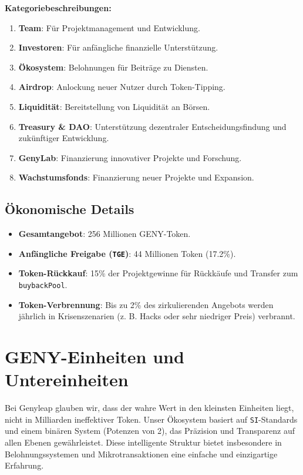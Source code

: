 \documentclass[a4paper,12pt,openany]{book}
\begin{document}
\textbf{Kategoriebeschreibungen:}
\begin{enumerate}
    \item \textbf{Team}: Für Projektmanagement und Entwicklung.
    \item \textbf{Investoren}: Für anfängliche finanzielle Unterstützung.
    \item \textbf{Ökosystem}: Belohnungen für Beiträge zu Diensten.
    \item \textbf{Airdrop}: Anlockung neuer Nutzer durch Token-Tipping.
    \item \textbf{Liquidität}: Bereitstellung von Liquidität an Börsen.
    \item \textbf{Treasury & DAO}: Unterstützung dezentraler Entscheidungsfindung und zukünftiger Entwicklung.
    \item \textbf{GenyLab}: Finanzierung innovativer Projekte und Forschung.
    \item \textbf{Wachstumsfonds}: Finanzierung neuer Projekte und Expansion.
\end{enumerate}

\subsection*{Ökonomische Details}
\begin{itemize}
    \item \textbf{Gesamtangebot}: 256 Millionen GENY-Token.
    \item \textbf{Anfängliche Freigabe (\texttt{TGE})}: 44 Millionen Token (17.2\%).
    \item \textbf{Token-Rückkauf}: 15\% der Projektgewinne für Rückkäufe und Transfer zum \texttt{buybackPool}.
    \item \textbf{Token-Verbrennung}: Bis zu 2\% des zirkulierenden Angebots werden jährlich in Krisenszenarien (z. B. Hacks oder sehr niedriger Preis) verbrannt.
\end{itemize}
\newpage

\section*{GENY-Einheiten und Untereinheiten}
Bei Genyleap glauben wir, dass der wahre Wert in den kleinsten Einheiten liegt, nicht in Milliarden ineffektiver Token. Unser Ökosystem basiert auf \texttt{SI}-Standards und einem binären System (Potenzen von 2), das Präzision und Transparenz auf allen Ebenen gewährleistet. Diese intelligente Struktur bietet insbesondere in Belohnungssystemen und Mikrotransaktionen eine einfache und einzigartige Erfahrung.
\end{document}
